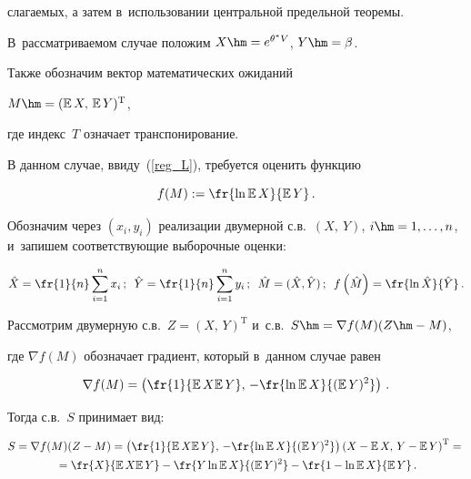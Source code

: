 слагаемых, а затем в~использовании  центральной предельной теоремы.


В~рассматриваемом случае  положим  $X\hm=e^{\theta^* V}$, $Y\hm=\beta$.


Также обозначим  вектор математических ожиданий


$M\hm=(\mathbb{E}\, X, \, \mathbb{E} \,Y)^{\mathrm{T}}$,


где индекс~$T$ означает транспонирование.


В данном случае, ввиду~(\ref{reg_L}),  требуется оценить  функцию


$$


f(M):= \fr{\ln \mathbb{E}\, X}{\mathbb{E}\, Y}\,.


$$


Обозначим через $(x_i, y_i)$ реализации двумерной с.в.~$(X, \ Y)$, $i\hm= 1, 


\ldots, n$, и~запишем соответствующие выборочные  оценки:


\begin{equation*}


\hat{X} = \fr{1}{n}\sum\limits_{i=1}^n x_i \,; \enskip


\hat{Y} = \fr{1}{n}\sum\limits_{i=1}^n y_i\,; \enskip


\hat{M} = (\hat{X}, \hat{Y})\,;\enskip


f\left(\hat{M}\right) = \fr{\ln \hat{X}}{\hat{Y}}\,.


\end{equation*}


Рассмотрим двумерную с.в.~$Z=(X, \,   Y)^{\mathrm{T}}$  и~с.в.\ $S \hm= \nabla f(M) (Z\hm-M)$,


где $\nabla f(M)$ обозначает градиент, который  в~данном случае  равен


$$


\nabla f(M) =


\left( \fr{1}{\mathbb{E}\, X \mathbb{E}\, Y},\,  


-\fr{\ln \mathbb{E}\, X}{(\mathbb{E}\, Y)^2}   \right)\,.


$$


Тогда с.в.~$S$ принимает  вид:


\begin{multline*}


S = \nabla f(M) (Z-M) =  


\left( \fr{1}{\mathbb{E}\, X \mathbb{E}\, Y}, \, -\fr{\ln \mathbb{E} \,X}{(\mathbb{E}\, Y)^2}


\right)   \left( X-\mathbb{E}\, X, \, Y-\mathbb{E} \,Y \right)^{\mathrm{T}}={}\\


{}= \fr{X}{\mathbb{E}\, X \mathbb{E}\, Y} -


 \fr{Y \ln \mathbb{E}\, X}{(\mathbb{E}\, Y)^2} - 


 \fr{1-\ln \mathbb{E}\, X}{\mathbb{E}\, Y}\,.


\end{multline*}


